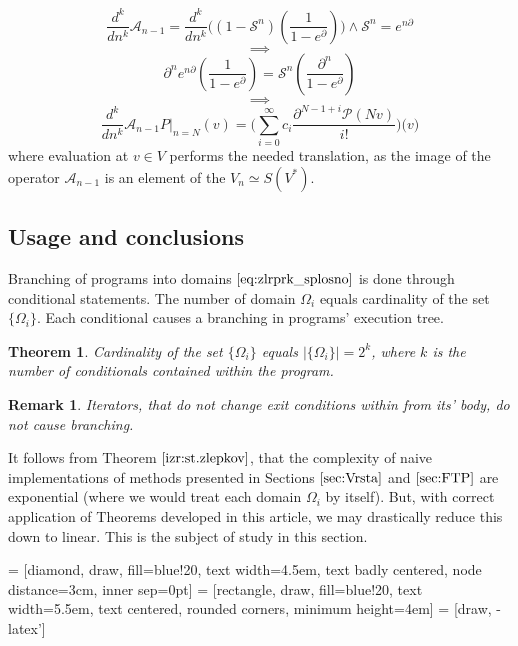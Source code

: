 \documentclass{article}
\newcommand{\Shift}{\mathcal{S}}
\newcommand{\dP}{\mathcal{P}}
\newcommand{\D}{\partial}
\newtheorem{izrek}{Theorem}[section]
\newtheorem{opomba}{Remark}[section]
\begin{document}
    $$\frac{d^k}{dn^k}\mathcal{A}_{n-1}=\frac{d^k}{dn^k}\Big((1-\Shift^n)(\frac{1}{1-e^\D})\Big)\land \Shift^n=e^{n\D}$$
        $$\implies$$
        $$\D^n e^{n\D}(\frac{1}{1-e^\D}) = \Shift^n(\frac{\D^n}{1-e^\D})$$
        $$\implies$$
        \begin{equation}
        \frac{d^k}{dn^k}\mathcal{A}_{n-1}P\vert_{n=N}(v)=\Big(\sum\limits_{i=0}^{\infty}c_i\frac{\D^{N-1+i}\dP(Nv)}{i!}\Big)\Big(v\Big)
        \end{equation}
        where evaluation at $v\in V$ performs the needed translation, as the image of the operator $\mathcal{A}_{n-1}$ is an element of the $V_n\simeq S(V^*)$.

\subsection{Usage and conclusions} 

Branching of programs into domains $\eqref{eq:zlrprk_splosno}$ is done through conditional statements. The number of domain $\Omega_i$ equals cardinality of the set $\{\Omega_i\}$. Each conditional causes a branching in programs' execution tree.

\begin{izrek}\label{izr:st.zlepkov}
Cardinality of the set $\{\Omega_i\}$ equals $\lvert\{\Omega_i \}\rvert=2^k$, where $k$ is the number of conditionals contained within the program.
\end{izrek}
\begin{opomba}
Iterators, that do not change exit conditions within from its' body, do not cause branching.
\end{opomba}

It follows from Theorem $\ref{izr:st.zlepkov}$, that the complexity of naive implementations of methods presented in Sections $\ref{sec:Vrsta}$ and $\ref{sec:FTP}$ are exponential (where we would treat each domain $\Omega_i$ by itself). But, with correct application of Theorems developed in this article, we may drastically reduce this down to linear. This is the subject of study in this section.
\vspace{10px}

 = [diamond, draw, fill=blue!20, 
    text width=4.5em, text badly centered, node distance=3cm, inner sep=0pt]
 = [rectangle, draw, fill=blue!20, 
    text width=5.5em, text centered, rounded corners, minimum height=4em]
 = [draw, -latex']
\end{document}
